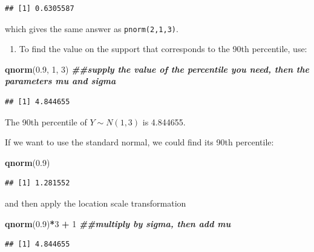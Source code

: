 \documentclass[
]{book}
\newenvironment{Shaded}{\begin{snugshade}}{\end{snugshade}}
\newcommand{\DecValTok}[1]{\textcolor[rgb]{0.00,0.00,0.81}{#1}}
\newcommand{\DocumentationTok}[1]{\textcolor[rgb]{0.56,0.35,0.01}{\textbf{\textit{#1}}}}
\newcommand{\FloatTok}[1]{\textcolor[rgb]{0.00,0.00,0.81}{#1}}
\newcommand{\FunctionTok}[1]{\textcolor[rgb]{0.13,0.29,0.53}{\textbf{#1}}}
\newcommand{\NormalTok}[1]{#1}
\newcommand{\SpecialCharTok}[1]{\textcolor[rgb]{0.81,0.36,0.00}{\textbf{#1}}}
\providecommand{\tightlist}{%
  \setlength{\itemsep}{0pt}\setlength{\parskip}{0pt}}
\begin{document}
\begin{verbatim}
## [1] 0.6305587
\end{verbatim}

which gives the same answer as \texttt{pnorm(2,1,3)}.

\begin{enumerate}
\def\labelenumi{\arabic{enumi}.}
\setcounter{enumi}{2}
\tightlist
\item
  To find the value on the support that corresponds to the 90th percentile, use:
\end{enumerate}

\begin{Shaded}
\begin{Highlighting}[]
\FunctionTok{qnorm}\NormalTok{(}\FloatTok{0.9}\NormalTok{, }\DecValTok{1}\NormalTok{, }\DecValTok{3}\NormalTok{) }\DocumentationTok{\#\#supply the value of the percentile you need, then the parameters mu and sigma}
\end{Highlighting}
\end{Shaded}

\begin{verbatim}
## [1] 4.844655
\end{verbatim}

The 90th percentile of \(Y \sim N(1,3)\) is 4.844655.

If we want to use the standard normal, we could find its 90th percentile:

\begin{Shaded}
\begin{Highlighting}[]
\FunctionTok{qnorm}\NormalTok{(}\FloatTok{0.9}\NormalTok{)}
\end{Highlighting}
\end{Shaded}

\begin{verbatim}
## [1] 1.281552
\end{verbatim}

and then apply the location scale transformation

\begin{Shaded}
\begin{Highlighting}[]
\FunctionTok{qnorm}\NormalTok{(}\FloatTok{0.9}\NormalTok{)}\SpecialCharTok{*}\DecValTok{3} \SpecialCharTok{+} \DecValTok{1} \DocumentationTok{\#\#multiply by sigma, then add mu}
\end{Highlighting}
\end{Shaded}

\begin{verbatim}
## [1] 4.844655
\end{verbatim}
\end{document}
